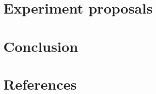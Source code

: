\documentclass[]{article}
\begin{document}
\section{Experiment proposals}


\section{Conclusion}
\section{References}
\end{document}
